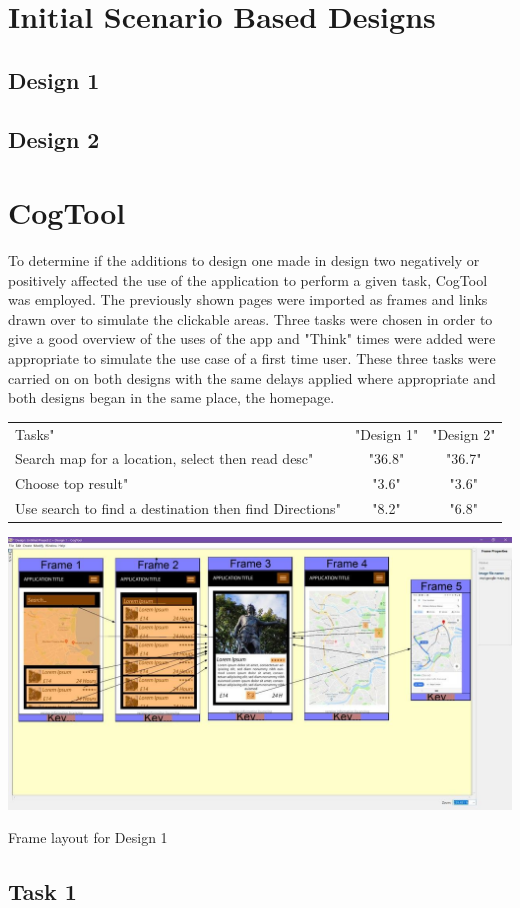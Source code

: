 \documentclass{article}
\begin{document}
\section{Initial Scenario Based Designs}
\subsection{Design 1}



\subsection{Design 2}




\section{CogTool}
To determine if the additions to design one made in design two negatively or positively affected the use of the application to perform a given task, CogTool was employed.
The previously shown pages were imported as frames and links drawn over to simulate the clickable areas.
Three tasks were chosen in order to give a good overview of the uses of the app and "Think" times were added were appropriate to simulate the use case of a first time user.
These three tasks were carried on on both designs with the same delays applied where appropriate and both designs began in the same place, the homepage.
\begin{table}[H]
\hspace{-0.5cm}
\begin{tabular}{lcc}
\hline
Tasks"&"Design 1"&"Design 2" \\
Search map for a location, select then read desc"&"36.8"&"36.7" \\
Choose top result"&"3.6"&"3.6" \\
Use search to find a destination then find Directions"&"8.2"&"6.8" \\
\hline
\end{tabular}
\end{table}

\begin{table}[H]
\hspace{-2.5cm}
\includegraphics{images/cogtoolframes.jpg}
	\caption{Frame layout for Design 1}
\end{table}

\subsection{Task 1}
\end{document}
